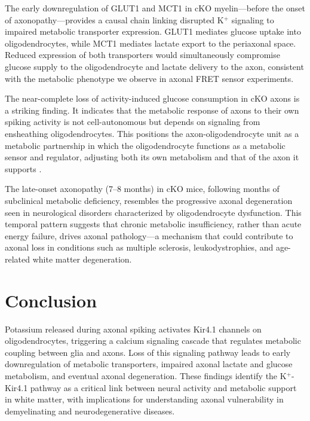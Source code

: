 \documentclass[12pt]{article}
\begin{document}
The early downregulation of GLUT1 and MCT1 in cKO myelin---before the onset of axonopathy---provides a causal chain linking disrupted K$^+$ signaling to impaired metabolic transporter expression. GLUT1 mediates glucose uptake into oligodendrocytes, while MCT1 mediates lactate export to the periaxonal space. Reduced expression of both transporters would simultaneously compromise glucose supply to the oligodendrocyte and lactate delivery to the axon, consistent with the metabolic phenotype we observe in axonal FRET sensor experiments.

The near-complete loss of activity-induced glucose consumption in cKO axons is a striking finding. It indicates that the metabolic response of axons to their own spiking activity is not cell-autonomous but depends on signaling from ensheathing oligodendrocytes. This positions the axon-oligodendrocyte unit as a metabolic partnership in which the oligodendrocyte functions as a metabolic sensor and regulator, adjusting both its own metabolism and that of the axon it supports \citep{nave2010myelination, philips2017oligodendroglia}.

The late-onset axonopathy (7--8 months) in cKO mice, following months of subclinical metabolic deficiency, resembles the progressive axonal degeneration seen in neurological disorders characterized by oligodendrocyte dysfunction. This temporal pattern suggests that chronic metabolic insufficiency, rather than acute energy failure, drives axonal pathology---a mechanism that could contribute to axonal loss in conditions such as multiple sclerosis, leukodystrophies, and age-related white matter degeneration.

\section{Conclusion}

Potassium released during axonal spiking activates Kir4.1 channels on oligodendrocytes, triggering a calcium signaling cascade that regulates metabolic coupling between glia and axons. Loss of this signaling pathway leads to early downregulation of metabolic transporters, impaired axonal lactate and glucose metabolism, and eventual axonal degeneration. These findings identify the K$^+$-Kir4.1 pathway as a critical link between neural activity and metabolic support in white matter, with implications for understanding axonal vulnerability in demyelinating and neurodegenerative diseases.



\end{document}
